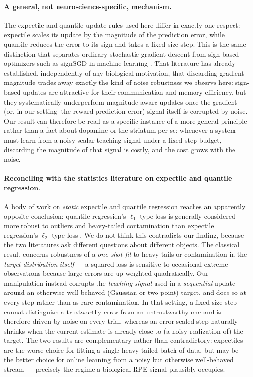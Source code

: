 \documentclass[11pt]{article}
\begin{document}
\paragraph{A general, not neuroscience-specific, mechanism.} The expectile and quantile update rules used here differ in exactly one respect: expectile scales its update by the magnitude of the prediction error, while quantile reduces the error to its sign and takes a fixed-size step. This is the same distinction that separates ordinary stochastic gradient descent from sign-based optimizers such as signSGD in machine learning \citep{bernstein2018}. That literature has already established, independently of any biological motivation, that discarding gradient magnitude trades away exactly the kind of noise robustness we observe here: sign-based updates are attractive for their communication and memory efficiency, but they systematically underperform magnitude-aware updates once the gradient (or, in our setting, the reward-prediction-error) signal itself is corrupted by noise. Our result can therefore be read as a specific instance of a more general principle rather than a fact about dopamine or the striatum per se: whenever a system must learn from a noisy scalar teaching signal under a fixed step budget, discarding the magnitude of that signal is costly, and the cost grows with the noise.

\paragraph{Reconciling with the statistics literature on expectile and quantile regression.} A body of work on \emph{static} expectile and quantile regression reaches an apparently opposite conclusion: quantile regression's $\ell_1$-type loss is generally considered more robust to outliers and heavy-tailed contamination than expectile regression's $\ell_2$-type loss \citep{newey1987,waltrup2015}. We do not think this contradicts our finding, because the two literatures ask different questions about different objects. The classical result concerns robustness of a \emph{one-shot fit} to heavy tails or contamination in the \emph{target distribution itself} --- a squared loss is sensitive to occasional extreme observations because large errors are up-weighted quadratically. Our manipulation instead corrupts the \emph{teaching signal} used in a \emph{sequential} update around an otherwise well-behaved (Gaussian or two-point) target, and does so at every step rather than as rare contamination. In that setting, a fixed-size step cannot distinguish a trustworthy error from an untrustworthy one and is therefore driven by noise on every trial, whereas an error-scaled step naturally shrinks when the current estimate is already close to (a noisy realization of) the target. The two results are complementary rather than contradictory: expectiles are the worse choice for fitting a single heavy-tailed batch of data, but may be the better choice for online learning from a noisy but otherwise well-behaved stream --- precisely the regime a biological RPE signal plausibly occupies.
\end{document}
